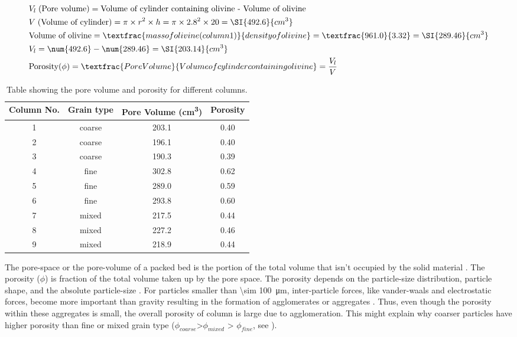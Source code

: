 \begin{align}
\begin{split}
\label{eq:pore_vol}
& V_l\;(\text{Pore volume}) = \text{Volume of cylinder containing olivine -  Volume of olivine}\\
& V\;(\text{Volume of cylinder}) = \pi \times r^2 \times h = \pi \times \mathrm{2.8^2} \times \text{20}=\SI{492.6}{cm^3}\\
& \text{Volume of olivine} = \textfrac{mass of olivine (column 1)}{density of olivine}=\textfrac{961.0}{3.32}=\SI{289.46}{cm^3}\\
& V_l = \num{492.6} - \num{289.46} = \SI{203.14}{cm^3}\\
& \text{Porosity} (\phi) = \textfrac{Pore Volume}{Volume of cylinder containing olivine}=\frac{V_l}{V}
\phantom{\hspace{0cm}}
\end{split}
\end{align}
\begin{table}[h]
     \begin{tabular}{cccc}
     \toprule
     \textbf{Column No.} & \textbf{Grain type} & \textbf{Pore Volume (\si{cm^3}) } & \textbf{Porosity} \\
     \midrule
     1 & coarse & 203.1 & 0.40 \\
     2 & coarse & 196.1 & 0.40 \\
     3 & coarse & 190.3 & 0.39 \\
     4 & fine & 302.8 & 0.62 \\
     5 & fine & 289.0 & 0.59 \\
     6 & fine & 293.8 & 0.60 \\
     7 & mixed & 217.5 & 0.44 \\
     8 & mixed & 227.2 & 0.46 \\
     9 & mixed & 218.9 & 0.44 \\
     \bottomrule
     \end{tabular}%
      \caption{Table showing the pore volume and porosity for different columns.}
   \label{tab:porosity}%
 \end{table}%

\noindent The pore-space or the pore-volume of a packed bed is the portion of the total volume that isn't occupied by the solid material \citep{nimmo2004}. The porosity ($\phi$) is fraction of the total volume taken up by the pore space. The porosity depends on the particle-size distribution, particle shape, and the absolute particle-size \citep{zou2011}. For particles smaller than \SI{\sim 100}{\micro\meter}, inter-particle forces, like vander-waals and electrostatic forces, become more important than gravity resulting in the formation of agglomerates or aggregates \citep{zou2011}. Thus, even though the porosity within these aggregates is small, the overall porosity of column is large due to agglomeration. This might explain why coarser particles have higher porosity than  fine or mixed grain type ($\phi_{coarse}$>$\phi_{mixed}$ > $\phi_{fine}$, see ). 


